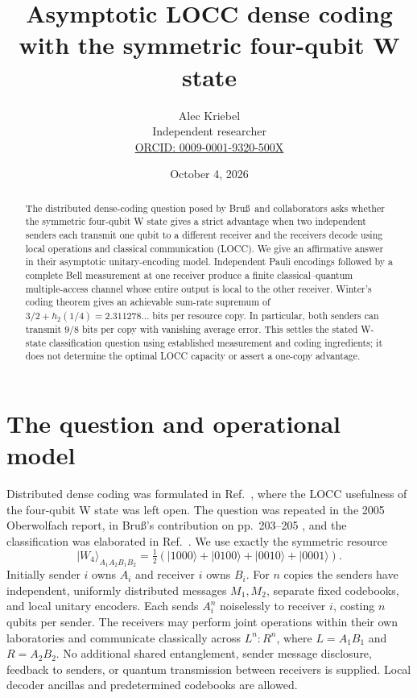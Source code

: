 \documentclass[11pt]{article}
\title{Asymptotic LOCC dense coding with the symmetric four-qubit W state}
\author{Alec Kriebel\\Independent researcher\\
\small\href{https://orcid.org/0009-0001-9320-500X}{ORCID: 0009-0001-9320-500X}}
\date{October 4, 2026}
\newcommand{\ket}[1]{\lvert #1\rangle}
\newcommand{\hbin}{h_2}
\begin{document}
\maketitle
\begin{abstract}
The distributed dense-coding question posed by Bru\ss\ and collaborators asks
whether the symmetric four-qubit W state gives a strict advantage when two
independent senders each transmit one qubit to a different receiver and the
receivers decode using local operations and classical communication (LOCC).
We give an affirmative answer in their asymptotic unitary-encoding model.
Independent Pauli encodings followed by a complete Bell measurement at one
receiver produce a finite classical--quantum multiple-access channel whose
entire output is local to the other receiver. Winter's coding theorem gives
an achievable sum-rate supremum of $3/2+\hbin(1/4)=2.311278\ldots$ bits per
resource copy. In particular, both senders can transmit $9/8$ bits per copy
with vanishing average error. This settles the stated W-state classification
question using established measurement and coding ingredients; it does not
determine the optimal LOCC capacity or assert a one-copy advantage.
\end{abstract}

\section{The question and operational model}
Distributed dense coding was formulated in Ref.~\cite{bruss2004}, where the
LOCC usefulness of the four-qubit W state was left open. The question was
repeated in the 2005 Oberwolfach report, in Bru\ss's contribution on
pp.~203--205 \cite{owr}, and the classification was elaborated in
Ref.~\cite{bruss2006}. We use exactly the symmetric resource
\begin{equation}\label{eq:resource}
 \ket{W_4}_{A_1A_2B_1B_2}
 =\tfrac12(\ket{1000}+\ket{0100}+\ket{0010}+\ket{0001}).
\end{equation}
Initially sender $i$ owns $A_i$ and receiver $i$ owns $B_i$.
For $n$ copies the senders have independent, uniformly distributed messages
$M_1,M_2$, separate fixed codebooks, and local unitary encoders. Each sends
$A_i^n$ noiselessly to receiver $i$, costing $n$ qubits per sender.
The receivers may perform joint operations within their own laboratories
and communicate classically across $L^n:R^n$, where
$L=A_1B_1$ and $R=A_2B_2$. No additional shared entanglement, sender message
disclosure, feedback to senders, or quantum transmission between receivers
is supplied. Local decoder ancillas and predetermined codebooks are allowed.
\end{document}
